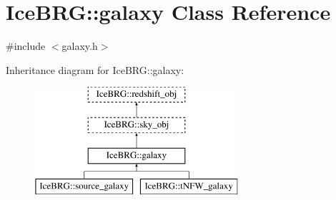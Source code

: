\hypertarget{classIceBRG_1_1galaxy}{}\section{Ice\+B\+R\+G\+:\+:galaxy Class Reference}
\label{classIceBRG_1_1galaxy}


{\ttfamily \#include $<$galaxy.\+h$>$}

Inheritance diagram for Ice\+B\+R\+G\+:\+:galaxy\+:\begin{figure}[H]
\begin{center}
\leavevmode
\includegraphics[height=4.000000cm]{classIceBRG_1_1galaxy}
\end{center}
\end{figure}
